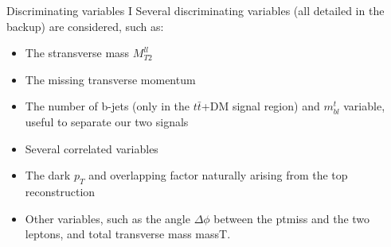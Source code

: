 \documentclass[8pt]{beamer}
\begin{document}
\begin{frame}{Discriminating variables I}
\justifying
Several discriminating variables (all detailed in the backup) are considered, such as:
\begin{itemize}
\item The stransverse mass $M_{T2}^{ll}$
\item The missing transverse momentum 
\item The number of b-jets (only in the $t \bar t$+DM signal region) and $m_{bl}^t$ variable, useful to separate our two signals
\item Several correlated variables
\item The dark $p_T$ and overlapping factor naturally arising from the top reconstruction
\item Other variables, such as the angle $\Delta \phi$ between the ptmiss and the two leptons, and total transverse mass massT.
\end{itemize} \vfill

\begin{table}
\begin{center}
\end{center}
\end{table} \vfill	
\end{frame}
\end{document}
